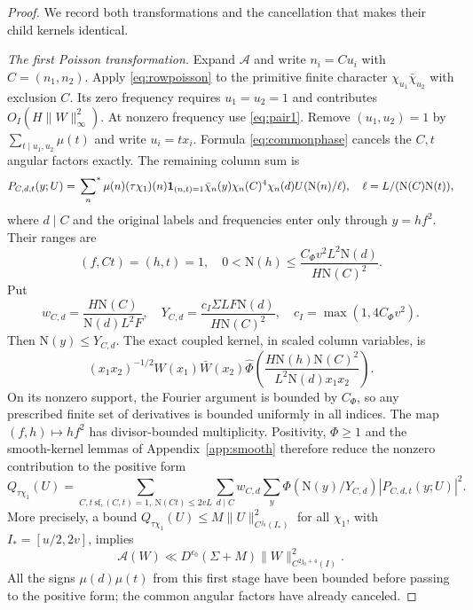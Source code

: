 \documentclass[11pt,a4paper]{article}
\numberwithin{equation}{section}
\theoremstyle{definition}
\theoremstyle{remark}
\newcommand{\N}{\mathrm N}
\newcommand{\ind}{\mathbf 1}
\newcommand{\sfstar}{\sideset{}{^*}\sum}
\newcommand{\wt}{\widehat}
\begin{document}
\begin{proof}
We record both transformations and the cancellation that makes their child kernels identical.

\emph{The first Poisson transformation.} Expand $\mathcal A$ and write $n_i=Cu_i$ with $C=(n_1,n_2)$. Apply \eqref{eq:rowpoisson} to the primitive finite character $\chi_{u_1}\bar\chi_{u_2}$ with exclusion $C$. Its zero frequency requires $u_1=u_2=1$ and contributes $O_I(H\|W\|_\infty^2)$. At nonzero frequency use \eqref{eq:pair1}. Remove $(u_1,u_2)=1$ by $\sum_{t\mid u_1,u_2}\mu(t)$ and write $u_i=tx_i$. Formula \eqref{eq:commonphase} cancels the $C,t$ angular factors exactly. The remaining column sum is
\begin{equation}\label{eq:firstP}
 P_{C,d,t}(y;U)=\sfstar_n\mu(n)(\tau\chi_1)(n)\ind_{(n,t)=1}
 \bar\chi_n(y)\chi_n(C)^4\chi_n(d)U(\N(n)/\ell),\quad \ell=L/(\N(C)\N(t)),
\end{equation}
where $d\mid C$ and the original labels and frequencies enter only through $y=hf^2$. Their ranges are
\[
 (f,Ct)=(h,t)=1,\quad
 0<\N(h)\le\frac{C_\Phi v^2L^2\N(d)}{H\N(C)^2}.
\]
Put
\[
 w_{C,d}=\frac{H\N(C)}{\N(d)L^2F},\quad
 Y_{C,d}=\frac{c_I\Sigma LF\N(d)}{H\N(C)^2},\quad
 c_I=\max(1,4C_\Phi v^2).
\]
Then $\N(y)\le Y_{C,d}$. The exact coupled kernel, in scaled column variables, is
\[
 (x_1x_2)^{-1/2}W(x_1)\bar W(x_2)
 \wt\Phi\left(\frac{H\N(h)\N(C)^2}{L^2\N(d)x_1x_2}\right).
\]
On its nonzero support, the Fourier argument is bounded by $C_\Phi$, so any prescribed finite set of derivatives is bounded uniformly in all indices. The map $(f,h)\mapsto hf^2$ has divisor-bounded multiplicity. Positivity, $\Phi\ge1$ and the smooth-kernel lemmas of Appendix~\ref{app:smooth} therefore reduce the nonzero contribution to the positive form
\begin{equation}\label{eq:Qform}
 Q_{\tau\chi_1}(U)=\sum_{C,t\ \mathrm{sf},(C,t)=1,\ \N(Ct)\le2vL}
 \sum_{d\mid C}w_{C,d}\sum_y\Phi(\N(y)/Y_{C,d})|P_{C,d,t}(y;U)|^2.
\end{equation}
More precisely, a bound $Q_{\tau\chi_1}(U)\le M\|U\|_{C^{j_0}(I_*)}^2$ for all $\chi_1$, with $I_*=[u/2,2v]$, implies
\begin{equation}\label{eq:firsttransfer}
 \mathcal A(W)\ll D^{\epsilon_0}(\Sigma+M)\|W\|_{C^{2j_0+4}(I)}^2.
\end{equation}
All the signs $\mu(d)\mu(t)$ from this first stage have been bounded before passing to the positive form; the common angular factors have already canceled.


\end{proof}
\end{document}
